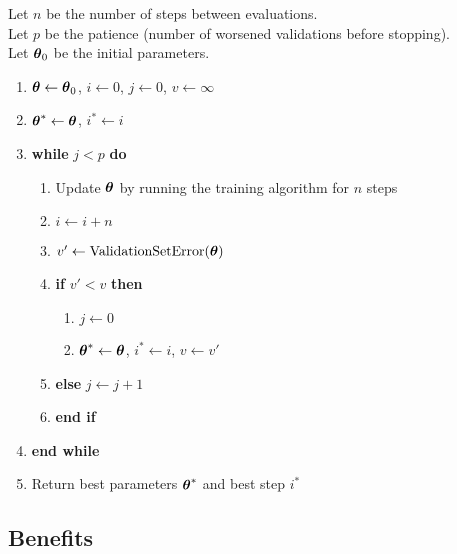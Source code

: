 \begin{algorithm}
Let $n$ be the number of steps between evaluations.\\
Let $p$ be the patience (number of worsened validations before stopping).\\
Let $\boldsymbol{\theta}_0$ be the initial parameters.

\begin{enumerate}[leftmargin=*]
    \item $\boldsymbol{\theta} \leftarrow \boldsymbol{\theta}_0$, $i \leftarrow 0$, $j \leftarrow 0$, $v \leftarrow \infty$
    \item $\boldsymbol{\theta}^* \leftarrow \boldsymbol{\theta}$, $i^* \leftarrow i$
    \item \textbf{while} $j < p$ \textbf{do}
    \begin{enumerate}
        \item Update $\boldsymbol{\theta}$ by running the training algorithm for $n$ steps
        \item $i \leftarrow i + n$
        \item $v' \leftarrow \text{ValidationSetError}(\boldsymbol{\theta})$
        \item \textbf{if} $v' < v$ \textbf{then}
        \begin{enumerate}
            \item $j \leftarrow 0$
            \item $\boldsymbol{\theta}^* \leftarrow \boldsymbol{\theta}$, $i^* \leftarrow i$, $v \leftarrow v'$
        \end{enumerate}
        \item \textbf{else} $j \leftarrow j + 1$
        \item \textbf{end if}
    \end{enumerate}
    \item \textbf{end while}
    \item Return best parameters $\boldsymbol{\theta}^*$ and best step $i^*$
\end{enumerate}
\end{algorithm}

\subsection{Benefits}

